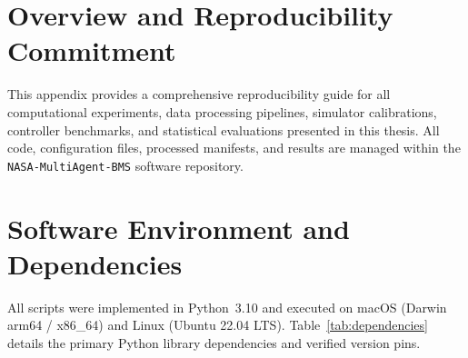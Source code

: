 \label{chap.appendix}

\section{Overview and Reproducibility Commitment}

This appendix provides a comprehensive reproducibility guide for all
computational experiments, data processing pipelines, simulator
calibrations, controller benchmarks, and statistical evaluations presented
in this thesis. All code, configuration files, processed manifests, and
results are managed within the \texttt{NASA-MultiAgent-BMS} software
repository.

\section{Software Environment and Dependencies}

All scripts were implemented in Python~3.10 and executed on macOS (Darwin
arm64 / x86\_64) and Linux (Ubuntu 22.04 LTS). Table~\ref{tab:dependencies}
details the primary Python library dependencies and verified version pins.

\begin{table}[htbp]
  \centering
  \caption{Primary software dependencies and package versions.}
  \label{tab:dependencies}
\end{table}

